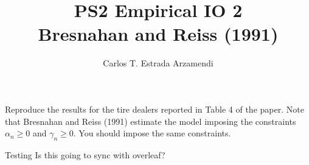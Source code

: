 \documentclass[12pt]{article}
\title{\vspace{-2cm}\textbf{PS2 Empirical IO 2}\\
Bresnahan and Reiss (1991)}
\author{Carlos T. Estrada Arzamendi}
\begin{document}
\maketitle

\section{}
Reproduce the results for the tire dealers reported in Table 4 of the paper. Note that
Bresnahan and Reiss (1991) estimate the model imposing the constraints $\alpha_n \geq 0$  and
$\gamma_n \geq 0$. You should impose the same constraints.

Testing Is this going to sync with overleaf?
\end{document}
